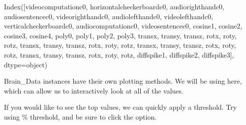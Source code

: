 \documentclass[letterpaper,10pt,english]{sphinxmanual}
\begin{document}
\begin{sphinxVerbatim}[commandchars=\\\{\}]
Index([\PYGZsq{}video\PYGZus{}computation\PYGZus{}c0\PYGZsq{}, \PYGZsq{}horizontal\PYGZus{}checkerboard\PYGZus{}c0\PYGZsq{},
       \PYGZsq{}audio\PYGZus{}right\PYGZus{}hand\PYGZus{}c0\PYGZsq{}, \PYGZsq{}audio\PYGZus{}sentence\PYGZus{}c0\PYGZsq{}, \PYGZsq{}video\PYGZus{}right\PYGZus{}hand\PYGZus{}c0\PYGZsq{},
       \PYGZsq{}audio\PYGZus{}left\PYGZus{}hand\PYGZus{}c0\PYGZsq{}, \PYGZsq{}video\PYGZus{}left\PYGZus{}hand\PYGZus{}c0\PYGZsq{}, \PYGZsq{}vertical\PYGZus{}checkerboard\PYGZus{}c0\PYGZsq{},
       \PYGZsq{}audio\PYGZus{}computation\PYGZus{}c0\PYGZsq{}, \PYGZsq{}video\PYGZus{}sentence\PYGZus{}c0\PYGZsq{}, \PYGZsq{}cosine\PYGZus{}1\PYGZsq{}, \PYGZsq{}cosine\PYGZus{}2\PYGZsq{},
       \PYGZsq{}cosine\PYGZus{}3\PYGZsq{}, \PYGZsq{}cosine\PYGZus{}4\PYGZsq{}, \PYGZsq{}poly\PYGZus{}0\PYGZsq{}, \PYGZsq{}poly\PYGZus{}1\PYGZsq{}, \PYGZsq{}poly\PYGZus{}2\PYGZsq{}, \PYGZsq{}poly\PYGZus{}3\PYGZsq{},
       \PYGZsq{}trans\PYGZus{}x\PYGZsq{}, \PYGZsq{}trans\PYGZus{}y\PYGZsq{}, \PYGZsq{}trans\PYGZus{}z\PYGZsq{}, \PYGZsq{}rot\PYGZus{}x\PYGZsq{}, \PYGZsq{}rot\PYGZus{}y\PYGZsq{}, \PYGZsq{}rot\PYGZus{}z\PYGZsq{}, \PYGZsq{}trans\PYGZus{}x\PYGZsq{},
       \PYGZsq{}trans\PYGZus{}y\PYGZsq{}, \PYGZsq{}trans\PYGZus{}z\PYGZsq{}, \PYGZsq{}rot\PYGZus{}x\PYGZsq{}, \PYGZsq{}rot\PYGZus{}y\PYGZsq{}, \PYGZsq{}rot\PYGZus{}z\PYGZsq{}, \PYGZsq{}trans\PYGZus{}x\PYGZsq{}, \PYGZsq{}trans\PYGZus{}y\PYGZsq{},
       \PYGZsq{}trans\PYGZus{}z\PYGZsq{}, \PYGZsq{}rot\PYGZus{}x\PYGZsq{}, \PYGZsq{}rot\PYGZus{}y\PYGZsq{}, \PYGZsq{}rot\PYGZus{}z\PYGZsq{}, \PYGZsq{}trans\PYGZus{}x\PYGZsq{}, \PYGZsq{}trans\PYGZus{}y\PYGZsq{}, \PYGZsq{}trans\PYGZus{}z\PYGZsq{},
       \PYGZsq{}rot\PYGZus{}x\PYGZsq{}, \PYGZsq{}rot\PYGZus{}y\PYGZsq{}, \PYGZsq{}rot\PYGZus{}z\PYGZsq{}, \PYGZsq{}diff\PYGZus{}spike1\PYGZsq{}, \PYGZsq{}diff\PYGZus{}spike2\PYGZsq{}, \PYGZsq{}diff\PYGZus{}spike3\PYGZsq{}],
      dtype=\PYGZsq{}object\PYGZsq{})
\end{sphinxVerbatim}

Brain\_Data instances have their own plotting methods. We will be using  here, which can allow us to interactively look at all of the values.

If you would like to see the top values, we can quickly apply a threshold. Try using \% threshold, and be sure to click the  option.
\end{document}
